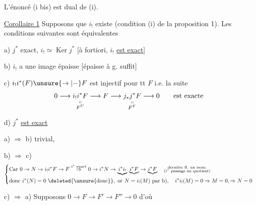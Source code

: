 


L'énoncé (i bis) est dual de (i).

\uline{Corollaire 1}  Supposons que $i_!$ existe (condition (i) de la proposition 1). Les conditions suivantes sont équivalentes

a) $j^*$ exact, $i_!\simeq\operatorname{Ker}j^*$ [à fortiori, $i_!$ \uline{est exact}]

b) $i_!$ a une image  épaisse [épaisse à g. suffit]

c) $i_!i^*(F)\unsure{\to|-}F$ est injectif pour tt $F$ i.e. la suite
\[
0\longrightarrow\underset{\substack{\shortparallel\\F^U}}{i_!i^*F}
\longrightarrow F\longrightarrow\underset{\substack{\shortparallel\\F^Y}}{j_*j^*F}
\longrightarrow 0\qquad\text{est exacte}
\]

d) $j^*$ \uline{est exact}


a) $\Rightarrow$ b) trivial,

b) $\Rightarrow$ c)
\[
\left\{\begin{aligned}
&\text{Car }0\to N\to i_!i^*F\to F \overset{i^*\text{ exact}}{\Rightarrow}0\to i^*N\to\underbrace{i^*i_!}\,\underbrace{i^*F}\to\underbrace{i^*F}\quad\substack{\text{dernière fl. un isom.}\\\text{($i^*$ passage au quotient)}}\\
&\text{donc }i^*(N)=0\ \deleted{\unsure{\text{donc}}},\ \text{or } N=i_!(M)\ \text{par b)},\quad i^*i_!(M)=0\Rightarrow M=0,\Rightarrow N=0
\end{aligned}\right.
\]

c) $\Rightarrow$ a)  Supposons \uline{$0\to F\to F'\to F''\to0$} d'où

\quad{}


